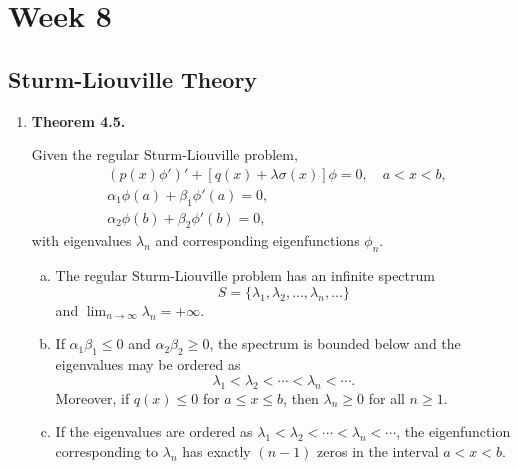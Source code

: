 \chapter{Week 8}
\setcounter{weekpage}{1}
\thispagestyle{plainweek}

\section{Sturm-Liouville Theory}


\begin{enumerate}



\item \textbf{Theorem 4.5.} 

Given the regular Sturm-Liouville problem,
\begin{align*}
& (p(x)\phi ' ) ' + [q(x) + \lambda \sigma(x)]\phi = 0, \quad a < x < b,\\
& \alpha _1 \phi(a) + \beta _1 \phi ' (a) = 0, \\
& \alpha _2 \phi(b) + \beta _2 \phi ' (b) = 0,
\end{align*}
with eigenvalues $\lambda_{n}$ and corresponding eigenfunctions $\phi_{n}$.

\begin{enumerate}[(a)]
    \item The regular Sturm-Liouville problem has an infinite spectrum
    \[S=\{\lambda_{1}, \lambda_{2}, \dots, \lambda_{n}, \dots \}\]
    and $\lim_{n\to \infty} \lambda _{n}=+\infty$.
    \item If $\alpha_{1}\beta_{1}\leq 0$ and $\alpha_{2}\beta_{2}\geq 0$, the spectrum is bounded below and the eigenvalues may be ordered as
    \[\lambda_{1}<\lambda_{2}< \cdots< \lambda_{n}< \cdots.\]
    Moreover, if $q(x) \leq 0$ for $a \leq x \leq b$, then $\lambda _{n} \geq 0$ for all $n \geq 1$.
    \item If the eigenvalues are ordered as $\lambda_{1}<\lambda_{2}< \cdots< \lambda_{n}< \cdots$, the eigenfunction corresponding to $\lambda _{n}$ has exactly $(n - 1)$ zeros in the interval $a < x < b$.
\end{enumerate}





\end{enumerate}

